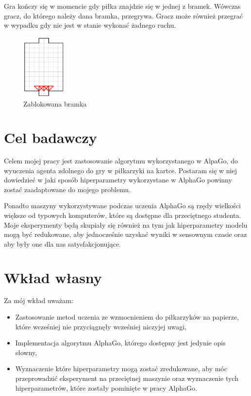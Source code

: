 \documentclass[licencjacka]{pracamgr}
\begin{document}
Gra kończy się w momencie gdy piłka znajdzie się w jednej z bramek.
Wówczas gracz, do którego należy dana bramka, przegrywa. 
Gracz może również przegrać w wypadku gdy nie jest w stanie wykonać żadnego ruchu.


\begin{figure}[ht]
  \centering
  \includegraphics[width=0.2\textwidth]{zablokowanie}
  \caption{Zablokowana bramka}
\end{figure}
 
\section{Cel badawczy} 


Celem mojej pracy jest zastosowanie algorytmu wykorzystanego w AlpaGo, do wyuczenia agenta zdolnego do gry w piłkarzyki na kartce. Postaram się w niej dowiedzieć w jaki sposób hiperparametry wykorzystane w AlphaGo powinny zostać zaadaptowane do mojego problemu. 

Ponadto maszyny wykorzystywane podczas uczenia AlphaGo są rzędy wielkości większe od typowych komputerów, które są dostępne dla przeciętnego studenta. Moje eksperymenty będą skupiały się również na tym jak hiperparametry modelu mogą być redukowane, aby jednocześnie uzyskać wyniki w sensownym czasie oraz aby były one dla nas satysfakcjonujące.


\section{Wkład własny}

Za mój wkład uważam:

\begin{itemize}

\item Zastosowanie metod uczenia ze wzmocnieniem do piłkarzyków na papierze, które wcześniej nie przyciągnęły wcześniej niczyjej uwagi,

\item Implementacja algorytmu AlphaGo, którego dostępny jest jedynie opis słowny,

\item Wyznaczenie które hiperparametry mogą zostać zredukowane, aby móc przeprowadzić eksperyment na przeciętnej maszynie oraz wyznaczenie tych hiperparametrów, które zostały pominięte w pracy AlphaGo.

\end{itemize}
\end{document}
